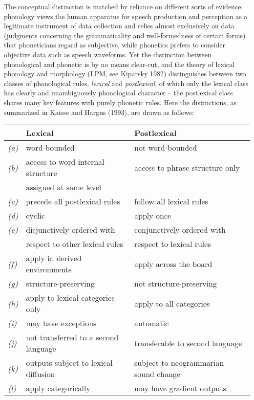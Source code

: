 The conceptual distinction is matched by reliance on different sorts of
evidence: phonology views the human apparatus for speech production and
perception as a legitimate instrument of data collection and relies almost
exclusively on data (judgments concerning the grammaticality and
well-formedness of certain forms) that phoneticians regard as subjective,
while phonetics prefers to consider objective data such as speech waveforms.
Yet the distinction between phonological and phonetic is by no means
clear-cut, and the theory of lexical phonology and morphology (LPM, see
Kiparsky 1982)\nocite{Kiparsky:1982} distinguishes between two classes of phonological rules, {\it lexical}
and {\it postlexical}, of which only the lexical class has clearly and
unambiguously phonological character -- the postlexical class shares many key
features with purely phonetic rules. Here the distinctions, as summarized in
Kaisse and Hargus (1993), are drawn as follows:\nocite{Kaisse:1993}

\smallskip
\begin{center}
\begin{tabular}{lll}
& {\bf Lexical} & {\bf Postlexical}\\ 
\hline 
{\it (a)} & word-bounded & not word-bounded\\
{\it (b)} & access to word-internal structure  & access to phrase structure only \\
&  assigned at same level  &\\
{\it (c)} & precede all postlexical rules & follow all lexical rules \\
{\it (d)} & cyclic & apply once \\
{\it (e)} & disjunctively ordered with  & conjunctively ordered with\\
& respect to other lexical rules &  respect to lexical rules \\
{\it (f)} & apply in derived environments & apply across the board \\
{\it (g)} & structure-preserving & not structure-preserving \\
{\it (h)} & apply to lexical categories only & apply to all categories \\
{\it (i)} & may have exceptions & automatic \\
{\it (j)} & not transferred to a second language & transferable to second language \\
{\it (k)} & outputs subject to lexical diffusion & subject to neogrammarian sound change \\
{\it (l)} & apply categorically & may have gradient outputs 
\end{tabular}
\end{center}

